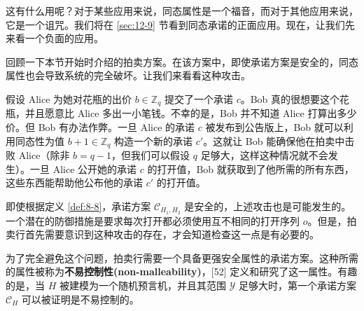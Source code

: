 \begin{snote}[一种同态的承诺方案。]
这有什么用呢？对于某些应用来说，同态属性是一个福音，而对于其他应用来说，它是一个诅咒。我们将在 \ref{sec:12-9} 节看到同态承诺的正面应用。现在，让我们先来看一个负面的应用。

\vspace{5pt}

回顾一下本节开始时介绍的拍卖方案。在该方案中，即使承诺方案是安全的，同态属性也会导致系统的完全破坏。让我们来看看这种攻击。

假设 Alice 为她对花瓶的出价 $b\in\mathbb{Z}_q$ 提交了一个承诺 $c$。Bob 真的很想要这个花瓶，并且愿意比 Alice 多出一小笔钱。不幸的是，Bob 并不知道 Alice 打算出多少价。但 Bob 有办法作弊。一旦 Alice 的承诺 $c$ 被发布到公告版上，Bob 就可以利用同态性为值 $b+1\in\mathbb{Z}_q$ 构造一个新的承诺 $c'$。这就让 Bob 能确保他在拍卖中击败 Alice（除非 $b=q-1$，但我们可以假设 $q$ 足够大，这样这种情况就不会发生）。一旦 Alice 公开她的承诺 $c$ 的打开值，Bob 就获取到了他所需的所有东西，这些东西能帮助他公布他的承诺 $c'$ 的打开值。

即使根据定义 \ref{def:8-8}，承诺方案 $\mathcal{C}_{H_1,H_2}$ 是安全的，上述攻击也是可能发生的。一个潜在的防御措施是要求每次打开都必须使用互不相同的打开序列 $o$。但是，拍卖行首先需要意识到这种攻击的存在，才会知道检查这一点是有必要的。

为了完全避免这个问题，拍卖行需要一个具备更强安全属性的承诺方案。这种所需的属性被称为\textbf{不易控制性(non-malleability)}，[52] 定义和研究了这一属性。有趣的是，当 $H$ 被建模为一个随机预言机，并且其范围 $\mathcal{Y}$ 足够大时，第一个承诺方案 $\mathcal{C}_H$ 可以被证明是不易控制的。
\end{snote}